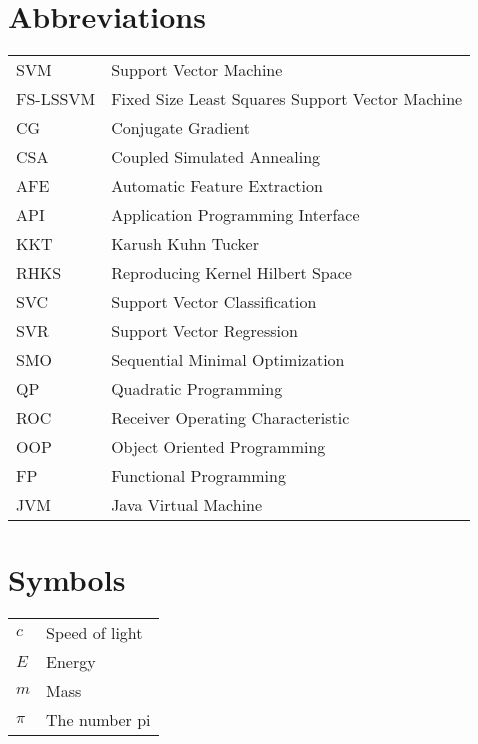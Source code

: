 \documentclass[master=mai,masteroption=ecs]{kulemt}
\begin{document}
\section*{Abbreviations}
\begin{flushleft}
  \renewcommand{\arraystretch}{1.1}
  \begin{tabularx}{\textwidth}{@{}p{12mm}X@{}}
    SVM   & Support Vector Machine \\
    FS-LSSVM   & Fixed Size Least Squares Support Vector Machine \\
    CG   & Conjugate Gradient \\
    CSA  & Coupled Simulated Annealing \\
    AFE  & Automatic Feature Extraction \\
    API  & Application Programming Interface \\ 
    KKT  & Karush Kuhn Tucker \\
    RHKS & Reproducing Kernel Hilbert Space\\
    SVC & Support Vector Classification\\
    SVR & Support Vector Regression\\
    SMO & Sequential Minimal Optimization\\
    QP & Quadratic Programming\\
    ROC & Receiver Operating Characteristic\\
    OOP & Object Oriented Programming\\
    FP & Functional Programming\\
    JVM & Java Virtual Machine\\
  \end{tabularx}
\end{flushleft}
\section*{Symbols}
\begin{flushleft}
  \renewcommand{\arraystretch}{1.1}
  \begin{tabularx}{\textwidth}{@{}p{12mm}X@{}}
    $c$   & Speed of light \\
    $E$   & Energy \\
    $m$   & Mass \\
    $\pi$ & The number pi \\
  \end{tabularx}
\end{flushleft}

\mainmatter








\appendixpage*          %
\appendix


\backmatter


\end{document}
